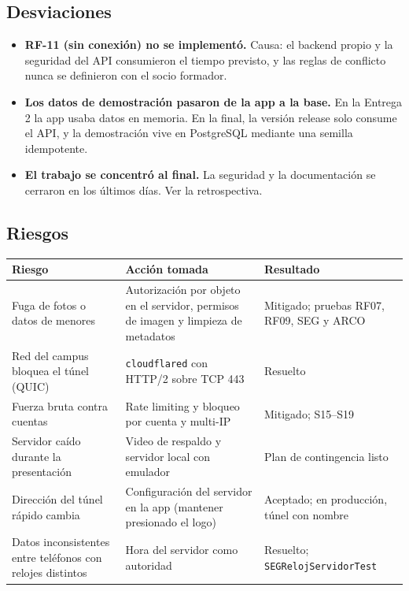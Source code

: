 \subsection{Desviaciones}
\begin{itemize}
	\item \textbf{RF-11 (sin conexión) no se implementó.} Causa: el backend propio y la seguridad del API consumieron el tiempo previsto, y las reglas de conflicto nunca se definieron con el socio formador.
	\item \textbf{Los datos de demostración pasaron de la app a la base.} En la Entrega 2 la app usaba datos en memoria. En la final, la versión release solo consume el API, y la demostración vive en PostgreSQL mediante una semilla idempotente.
	\item \textbf{El trabajo se concentró al final.} La seguridad y la documentación se cerraron en los últimos días. Ver la retrospectiva.
\end{itemize}

\subsection{Riesgos}
\begin{longtable}{p{4.8cm}p{5.6cm}p{4.4cm}}
\toprule
\textbf{Riesgo} & \textbf{Acción tomada} & \textbf{Resultado}\\\midrule\endhead
Fuga de fotos o datos de menores & Autorización por objeto en el servidor, permisos de imagen y limpieza de metadatos & Mitigado; pruebas RF07, RF09, SEG y ARCO\\
Red del campus bloquea el túnel (QUIC) & \texttt{cloudflared} con HTTP/2 sobre TCP 443 & Resuelto\\
Fuerza bruta contra cuentas & Rate limiting y bloqueo por cuenta y multi-IP & Mitigado; S15--S19\\
Servidor caído durante la presentación & Video de respaldo y servidor local con emulador & Plan de contingencia listo\\
Dirección del túnel rápido cambia & Configuración del servidor en la app (mantener presionado el logo) & Aceptado; en producción, túnel con nombre\\
Datos inconsistentes entre teléfonos con relojes distintos & Hora del servidor como autoridad & Resuelto; \texttt{SEGReloj\allowbreak{}Servidor\allowbreak{}Test}\\
\bottomrule
\end{longtable}

